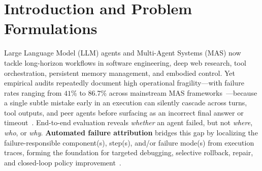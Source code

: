 \section{Introduction and Problem Formulations}\label{sec:intro}

Large Language Model (LLM) agents and Multi-Agent Systems (MAS) now tackle long-horizon workflows in software engineering, deep web research, tool orchestration, persistent memory management, and embodied control. Yet empirical audits repeatedly document high operational fragility---with failure rates ranging from $41\%$ to $86.7\%$ across mainstream MAS frameworks~\citep{cemri2025mast,zhang2025who}---because a single subtle mistake early in an execution can silently cascade across turns, tool outputs, and peer agents before surfacing as an incorrect final answer or timeout~\citep{zhao2026failureprocess,zhang2025who}.
End-to-end evaluation reveals \emph{whether} an agent failed, but not \emph{where}, \emph{who}, or \emph{why}. \textbf{Automated failure attribution} bridges this gap by localizing the failure-responsible component(s), step(s), and/or failure mode(s) from execution traces, forming the foundation for targeted debugging, selective rollback, repair, and closed-loop policy improvement~\citep{qi2026life}.

